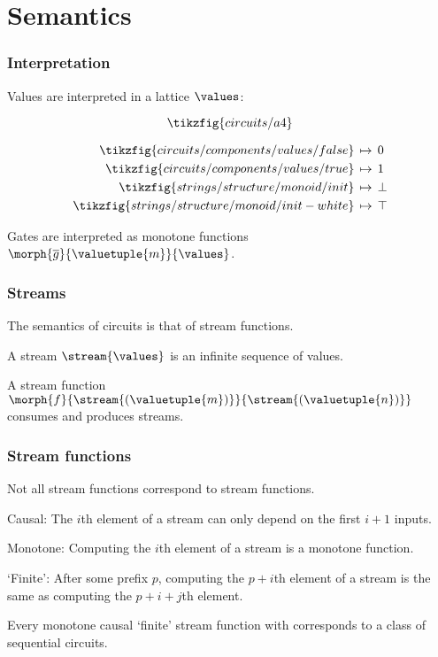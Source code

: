 \section{Semantics}

\begin{frame}
    \frametitle{Interpretation}

    Values are interpreted in a \alert{lattice} \(\values\):

    \begin{minipage}{0.49\textwidth}
        \[
            \tikzfig{circuits/a4}
        \]
    \end{minipage}
    \begin{minipage}{0.49\textwidth}
        \begin{align*}
            \tikzfig{circuits/components/values/false} 
            \,&\mapsto\, 0 \\
            \tikzfig{circuits/components/values/true} 
            \,&\mapsto\, 1 \\
            \tikzfig{strings/structure/monoid/init} 
            \,&\mapsto\, \bot \\
            \tikzfig{strings/structure/monoid/init-white} 
            \,&\mapsto\, \top \\
        \end{align*}
    \end{minipage}

    Gates are interpreted as \alert{monotone functions} \(\morph{\overline{g}}{\valuetuple{m}}{\values}\).
\end{frame}

\begin{frame}
    \frametitle{Streams}

    The semantics of circuits is that of \alert{stream functions}.

    \pause

    A \alert{stream} \(\stream{\values}\) is an infinite sequence of values.
    
    \pause
    
    A \alert{stream function} \(\morph{f}{\stream{(\valuetuple{m})}}{\stream{(\valuetuple{n})}}\) consumes and produces streams.
\end{frame}

\begin{frame}
    \frametitle{Stream functions}

    Not all stream functions correspond to stream functions.

    \alert{Causal}: The \(i\)th element of a stream can only depend on the first \(i+1\) inputs.

    \alert{Monotone}: Computing the \(i\)th element of a stream is a monotone function.

    \alert{`Finite'}: After some prefix \(p\), computing the \(p+i\)th element of a stream is the same as computing the \(p+i+j\)th element.

    \begin{theorem}
        Every monotone causal `finite' stream function with corresponds to a class of sequential circuits. 
    \end{theorem}
\end{frame}
